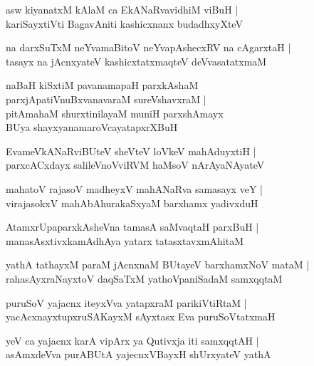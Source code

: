 \begin{shloka}
asw kiyanatxM kAlaM ca EkANaRvavidhiM viBuH |\\
kariSayxtiVti BagavAniti kashicxnanx budadhxyXteV 
\end{shloka}

\begin{shloka}
na darxSuTxM neYvamaBitoV neYvapAshecxRV na cAgarxtaH |\\
tasayx na jAcnxyateV kashicxtatxmaqteV deVvasatatxmaM 
\end{shloka}

\begin{shloka}
naBaH kiSxtiM pavanamapaH parxkAshaM \\
parxjApatiVnuBxvanavaraM sureVshavxraM |\\
pitAmahaM shurxtinilayaM muniH parxshAmayx \\
BUya shayxyanamaroVcayatapxrXBuH
\end{shloka}

\begin{shloka}
EvameVkANaRviBUteV sheVteV loVkeV mahAduyxtiH |\\
parxcACxdayx salileVnoVviRVM haMsoV nArAyaNAyateV 
\end{shloka}

\begin{shloka}
mahatoV rajasoV madheyxV mahANaRva samasayx veY |\\
virajasokxV mahAbAhurakaSxyaM barxhamx yadivxduH
\end{shloka}

\begin{shloka}
AtamxrUpaparxkAsheVna tamasA saMvaqtaH parxBuH |\\
manasAsxtivxkamAdhAya yatarx tatasxtavxmAhitaM 
\end{shloka}

\begin{shloka}
yathA tathayxM paraM jAcnxnaM BUtayeV barxhamxNoV mataM |\\
rahasAyxraNayxtoV daqSaTxM yathoVpaniSadaM samxqqtaM 
\end{shloka}

\begin{shloka}
puruSoV yajacnx iteyxVva yatapxraM parikiVtiRtaM |\\
yacAcxnayxtupxruSAKayxM sAyxtasx Eva puruSoVtatxmaH 
\end{shloka}

\begin{shloka}
yeV ca yajacnx karA vipArx ya Qutivxja iti samxqqtAH |\\
asAmxdeVva purABUtA yajecnxVBayxH shUrxyateV yathA
\end{shloka}

